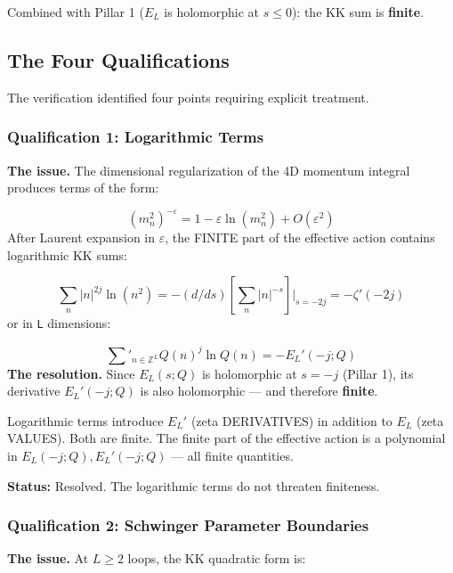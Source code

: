 \documentclass[aps,prd,preprint,superscriptaddress,longbibliography,floatfix]{revtex4-2}
\theoremstyle{remark}
\begin{document}
Combined with Pillar 1 ($E_L$ is holomorphic at $s \leq 0$): the KK sum is \textbf{finite}.



\subsection{The Four Qualifications}

The verification identified four points requiring explicit treatment.


\subsubsection{Qualification 1: Logarithmic Terms}

\textbf{The issue.} The dimensional regularization of the 4D momentum integral produces terms of the form:


\begin{equation}
    (m_n^{2})^{-\varepsilon} = 1 - \varepsilon \ln(m_n^{2}) + O(\varepsilon^{2})
\end{equation}
After Laurent expansion in $\varepsilon$, the FINITE part of the effective action contains logarithmic KK sums:


\begin{equation}
    \sum_n |n|^{2j} \ln(n^{2}) = -(d/ds)[\sum_n |n|^{-s}]|_{s=-2j} = -\zeta'(-2j)
\end{equation}
or in \texttt{L} dimensions:


\begin{equation}
    \sum'_{n \in \mathbb{Z}^L} Q(n)^j \ln Q(n) = -E_L'(-j; Q)
\end{equation}
\textbf{The resolution.} Since $E_L(s; Q)$ is holomorphic at $s = -j$ (Pillar 1), its derivative $E_L'(-j; Q)$ is also holomorphic --- and therefore \textbf{finite}.

Logarithmic terms introduce $E_L'$ (zeta DERIVATIVES) in addition to $E_L$ (zeta VALUES). Both are finite. The finite part of the effective action is a polynomial in ${E_L(-j; Q), E_L'(-j; Q)}$ --- all finite quantities.

\textbf{Status:} Resolved. The logarithmic terms do not threaten finiteness.


\subsubsection{Qualification 2: Schwinger Parameter Boundaries}

\textbf{The issue.} At $L \geq 2$ loops, the KK quadratic form is:
\end{document}
